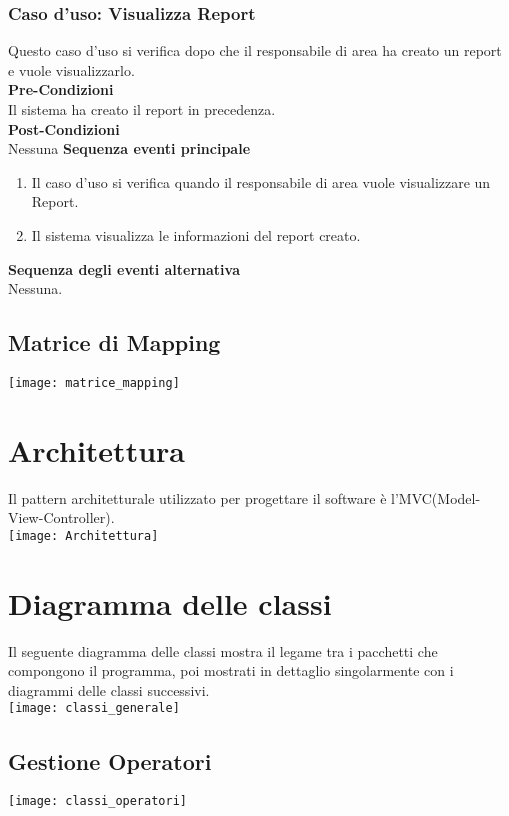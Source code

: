 \documentclass[green, fancy, 11pt]{elegantbook}
\begin{document}
\subsubsection{Caso d'uso: Visualizza Report}
\noindent
Questo caso d'uso si verifica dopo che il responsabile di area ha creato un report e vuole visualizzarlo.\\
\textbf{Pre-Condizioni}\\
Il sistema ha creato il report in precedenza.\\
\textbf{Post-Condizioni}\\
Nessuna
\textbf{Sequenza eventi principale}
\begin{enumerate}
	\item Il caso d'uso si verifica quando il responsabile di area vuole visualizzare un Report.
	\item Il sistema visualizza le informazioni del report creato.
\end{enumerate}
\textbf{Sequenza degli eventi alternativa}\\
Nessuna.
\newpage

{
\begin{landscape}
\subsection{Matrice di Mapping}
\scriptsize
\noindent \texttt{[image: matrice\_mapping]}
\end{landscape}
}

\section{Architettura}
\noindent Il pattern architetturale utilizzato per progettare il software è l'MVC(Model-View-Controller).\\
\texttt{[image: Architettura]}

\newpage
\section{Diagramma delle classi}
\noindent Il seguente diagramma delle classi mostra il legame tra i pacchetti che compongono il programma, poi mostrati in dettaglio singolarmente con i diagrammi delle classi successivi.\\
\noindent \texttt{[image: classi\_generale]}
\newpage

\subsection{Gestione Operatori}
\noindent \texttt{[image: classi\_operatori]}
\end{document}
